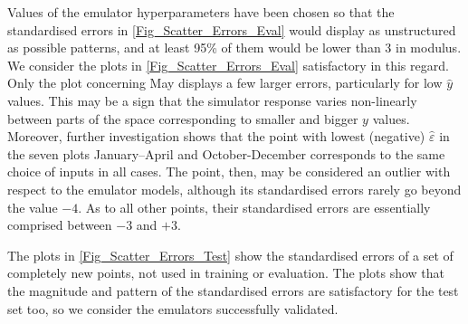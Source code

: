 \documentclass[a4paper, 12pt]{article}
\newcommand{\eps}{\varepsilon}
\begin{document}
Values of the emulator hyperparameters have been chosen so that the standardised errors in \autoref{Fig_Scatter_Errors_Eval} would display as unstructured as possible patterns, and at least 95\% of them would be lower than 3 in modulus. We consider the plots in \autoref{Fig_Scatter_Errors_Eval} satisfactory in this regard. Only the plot concerning May displays a few larger errors, particularly for low $\hat y$ values. This may be a sign that the simulator response varies non-linearly between parts of the space corresponding to smaller and bigger $y$ values. Moreover, further investigation shows that the point with lowest (negative) $\hat \eps$ in the seven plots January--April and October-December corresponds to the same choice of inputs in all cases. The point, then, may be considered an outlier with respect to the emulator models, although its standardised errors rarely go beyond the value $-4$. As to all other points, their standardised errors are essentially comprised between $-3$ and $+3$. 

The plots in \autoref{Fig_Scatter_Errors_Test} show the standardised errors of a set of completely new points, not used in training or evaluation. The plots show that the magnitude and pattern of the standardised errors are satisfactory for the test set too, so we consider the emulators successfully validated.
\end{document}
